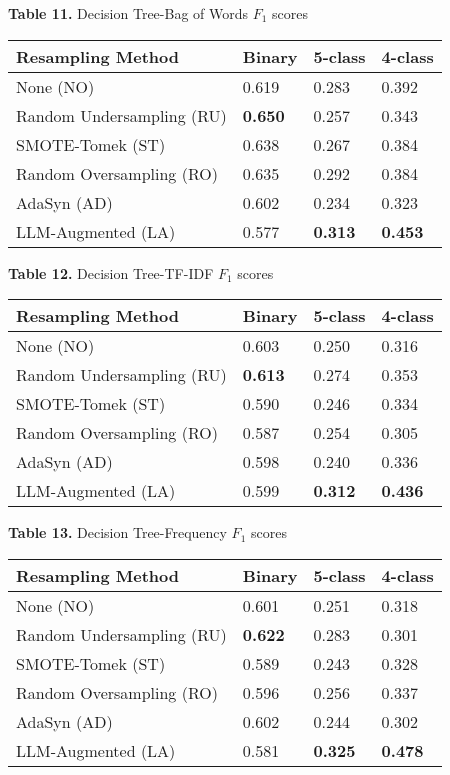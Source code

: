 \documentclass[runningheads]{llncs}
\newenvironment{nscenter}
 {\parskip=0pt\par\nopagebreak\centering}
 {\par\noindent\ignorespacesafterend}
\begin{document}
\begin{nscenter}
{\bf Table 11.} Decision Tree-Bag of Words $F_1$ scores\\

\begin{tabular}{|l|l|l|l|}
\hline
Resampling Method & Binary & 5-class & 4-class \\\hline
None (NO) & 0.619 & 0.283 & 0.392 \\\hline
Random Undersampling (RU) & {\bf 0.650} & 0.257 & 0.343 \\\hline
SMOTE-Tomek (ST) & 0.638 & 0.267 & 0.384 \\\hline
Random Oversampling (RO) & 0.635 & 0.292 & 0.384 \\\hline
AdaSyn (AD) & 0.602 & 0.234 & 0.323 \\\hline
LLM-Augmented (LA) & 0.577 & {\bf 0.313} & {\bf 0.453} \\\hline
\end{tabular}
\end{nscenter}

\begin{nscenter}
{\bf Table 12.} Decision Tree-TF-IDF $F_1$ scores\\

\begin{tabular}{|l|l|l|l|}
\hline
Resampling Method & Binary & 5-class & 4-class \\\hline
None (NO) & 0.603 & 0.250 & 0.316 \\\hline
Random Undersampling (RU) & {\bf 0.613} & 0.274 & 0.353 \\\hline
SMOTE-Tomek (ST) & 0.590 & 0.246 & 0.334 \\\hline
Random Oversampling (RO) & 0.587 & 0.254 & 0.305 \\\hline
AdaSyn (AD) & 0.598 & 0.240 & 0.336 \\\hline
LLM-Augmented (LA) & 0.599 & {\bf 0.312} & {\bf 0.436} \\\hline
\end{tabular}
\end{nscenter}


\begin{nscenter}
{\bf Table 13.} Decision Tree-Frequency $F_1$ scores\\

\begin{tabular}{|l|l|l|l|}
\hline
Resampling Method & Binary & 5-class & 4-class \\\hline
None (NO) & 0.601 & 0.251 & 0.318 \\\hline
Random Undersampling (RU) & {\bf 0.622} & 0.283 & 0.301 \\\hline
SMOTE-Tomek (ST) & 0.589 & 0.243 & 0.328 \\\hline
Random Oversampling (RO) & 0.596 & 0.256 & 0.337 \\\hline
AdaSyn (AD) & 0.602 & 0.244 & 0.302 \\\hline
LLM-Augmented (LA) & 0.581 & {\bf 0.325} & {\bf 0.478} \\\hline
\end{tabular}
\end{nscenter}
\end{document}
